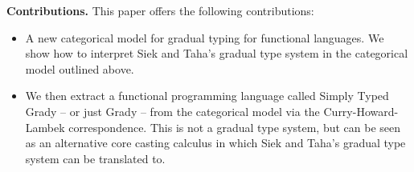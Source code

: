 \textbf{Contributions.} This paper offers the following contributions:
\begin{itemize}

\item A new categorical model for gradual typing for functional
  languages.  We show how to interpret Siek and Taha's
  \cite{Siek:2015} gradual type system in the categorical model
  outlined above.

\item We then extract a functional programming language called Simply
  Typed Grady -- or just Grady -- from the categorical model via the
  Curry-Howard-Lambek correspondence.  This is not a gradual type
  system, but can be seen as an alternative core casting calculus in
  which Siek and Taha's gradual type system can be translated to.
  
\end{itemize}

